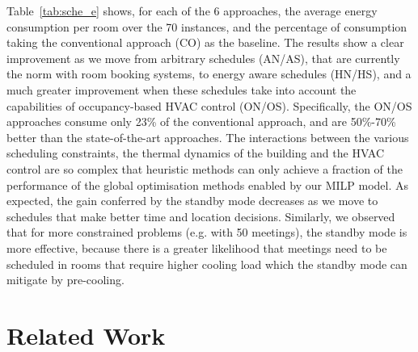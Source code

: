 Table~\ref{tab:sche_e} shows, for each of the 6 approaches, the average energy consumption per room over the 70 instances, and the percentage of consumption taking the conventional approach (CO) as the baseline. The results show a clear improvement as we move from arbitrary schedules (AN/AS), that are currently the norm with room booking systems, to energy aware schedules (HN/HS), and a much greater improvement when these  schedules take into account the capabilities of occupancy-based HVAC control (ON/OS). Specifically, the ON/OS approaches consume only 23\% of the conventional approach, and are 50\%-70\% better than the state-of-the-art approaches. The interactions between the various scheduling constraints, the thermal dynamics of the building and the HVAC control are so complex that heuristic methods can only achieve a fraction  of the performance of the global optimisation methods enabled by our MILP model.  As expected, the gain conferred by the standby mode  decreases as we move to schedules that make better time and location decisions. Similarly, we observed that for more constrained problems (e.g. with 50 meetings), the standby mode is more effective, because there is a greater likelihood that meetings need to be scheduled in rooms that require higher cooling load which the standby mode can mitigate by pre-cooling.


\section{Related Work}
\label{sec:mip:related}

